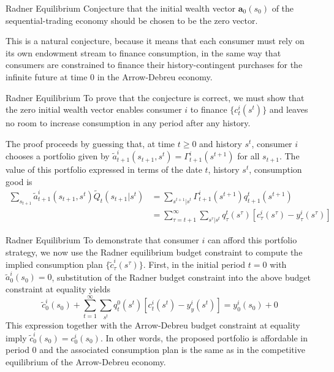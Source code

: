 \documentclass[aspectratio=169,xcolor=dvipsnames]{beamer}
\begin{document}
\begin{frame}{Radner Equilibrium}
    Conjecture that the initial wealth vector $\mathbf{a}_0(s_0)$ of the sequential-trading economy should be chosen to be the zero vector.

    This is a natural conjecture, because it means that each consumer must rely on its own endowment stream to finance consumption, in the same way that consumers are constrained to finance their history-contingent purchases for the infinite future at time 0 in the Arrow-Debreu economy.
\end{frame}

\begin{frame}{Radner Equilibrium}
    To prove that the conjecture is correct, we must show that the zero initial wealth vector enables consumer $i$ to finance $\{c^i_t(s^t)\}$ and leaves no room to increase consumption in any period after any history.

    The proof proceeds by guessing that, at time $t \ge 0$ and history $s^t$, consumer $i$ chooses a portfolio given by $\tilde a^i_{t+1}(s_{t+1}, s^t) = \Gamma^i_{t+1}(s^{t+1})$ for all $s_{t+1}$. The value of this portfolio expressed in terms of the date $t$, history $s^t$, consumption good is
    \begin{align*}
        \sum_{s_{t+1}} \tilde a^i_{t+1}(s_{t+1}, s^t) \tilde Q_t(s_{t+1} | s^t) &= \sum_{s^{t+1} | s^t} \Gamma^i_{t+1}(s^{t+1}) q^t_{t+1}(s^{t+1}) \\
        &= \sum_{\tau=t+1}^\infty \sum_{s^\tau | s^t} q^t_\tau(s^\tau) [c^i_\tau(s^\tau) - y^i_\tau(s^\tau)]
    \end{align*}
\end{frame}

\begin{frame}{Radner Equilibrium}
    To demonstrate that consumer $i$ can afford this portfolio strategy, we now use the Radner equilibrium budget constraint to compute the implied consumption plan $\{\tilde c^i_\tau(s^\tau)\}$. First, in the initial period $t = 0$ with $\tilde a^i_0(s_0) = 0$, substitution of the Radner budget constraint into the above budget constraint at equality yields
    \[
        \tilde c^i_0(s_0) + \sum_{t=1}^\infty \sum_{s^t} q^0_t(s^t)[c^i_t(s^t) - y^i_y(s^t)] = y^i_0(s_0) + 0
    \]
    This expression together with the Arrow-Debreu budget constraint at equality imply $\tilde c^i_0(s_0) = c^i_0(s_0)$. In other words, the proposed portfolio is affordable in period 0 and the associated consumption plan is the same as in the competitive equilibrium of the Arrow-Debreu economy.
\end{frame}
\end{document}
